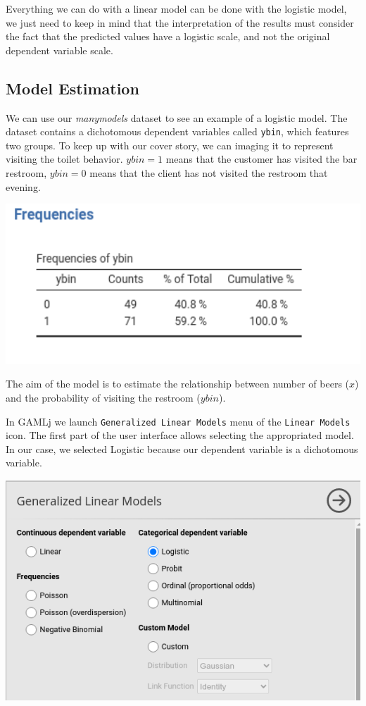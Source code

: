 \documentclass[
]{book}
\begin{document}
Everything we can do with a linear model can be done with the logistic model, we just need to keep in mind that the interpretation of the results must consider the fact that the predicted values have a logistic scale, and not the original dependent variable scale.

\hypertarget{model-estimation}{%
\subsection{Model Estimation}\label{model-estimation}}

We can use our \emph{manymodels} dataset to see an example of a logistic model. The dataset contains a dichotomous dependent variables called \texttt{ybin}, which features two groups. To keep up with our cover story, we can imaging it to represent visiting the toilet behavior. \(ybin=1\) means that the customer has visited the bar restroom, \(ybin=0\) means that the client has not visited the restroom that evening.

\includegraphics[width=5.29in]{bookletpics/3_logistic_freq1}

The aim of the model is to estimate the relationship between number of beers (\(x\)) and the probability of visiting the restroom (\(ybin\)).

In {GAMLj} we launch \texttt{Generalized\ Linear\ Models} menu of the \texttt{Linear\ Models} icon. The first part of the user interface allows selecting the appropriated model. In our case, we selected {Logistic} because our dependent variable is a dichotomous variable.

\includegraphics[width=8.08in]{bookletpics/3_logistic_input1}
\end{document}
